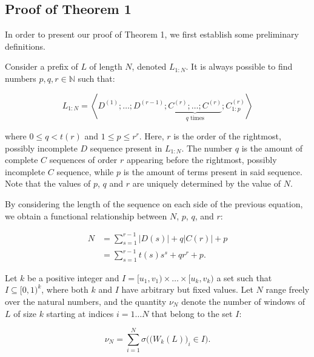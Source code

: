 \documentclass[11pt,a4paper]{tesis}
\theoremstyle{plain}
\theoremstyle{definition}
\begin{document}
\subsection{Proof of Theorem 1}\label{subsection:proof-of-theorem 1}

In order to present our proof of Theorem 1, we first establish some preliminary definitions.

Consider a prefix of $L$ of length $N$, denoted $L_{1 : N}$. It is always possible to find numbers $p, q, r \in \mathbb{N}$ such that:

\begin{equation*}
  L_{1:N} = \left< D^{(1)} ; \dots ; D^{(r - 1)} ; \underbrace{C^{(r)} ; \dots ; C^{(r)}}_{q \text{ times}} ; C^{(r)}_{1:p} \right>
\end{equation*}

where $0 \le q < t(r)$ and $1 \le p \le r^r$. Here, $r$ is the order of the rightmost, possibly incomplete $D$ sequence present in $L_{1:N}$. The number $q$ is the amount of complete $C$ sequences of order $r$ appearing before the rightmost, possibly incomplete $C$ sequence, while $p$ is the amount of terms present in said sequence. Note that the values of $p$, $q$ and $r$ are uniquely determined by the value of $N$.

By considering the length of the sequence on each side of the previous equation, we obtain a functional relationship between $N$, $p$, $q$, and $r$:

\begin{equation}\label{equation:n-p-q-r}
  \begin{aligned}
    N & = \sum_{s = 1}^{r - 1} |D(s)| + q |C(r)| + p \\
      & = \sum_{s = 1}^{r - 1} t(s) s^s + q r^r + p \text{.}
  \end{aligned}
\end{equation}

Let $k$ be a positive integer and $I = [u_1, v_1)  \times \dots \times [u_k, v_k)$ a set such that $I \subseteq [0, 1)^k$, where both $k$ and $I$ have arbitrary but fixed values. Let $N$ range freely over the natural numbers, and the quantity $\nu_N$ denote the number of windows of $L$ of size $k$ starting at indices $i = 1 \dots N$ that belong to the set $I$:

\begin{equation*}
  \nu_N = \sum_{i = 1}^{N} \sigma\Big( \big( W_k(L) \big)_i \in I \Big) \text{.}
\end{equation*}
\end{document}
